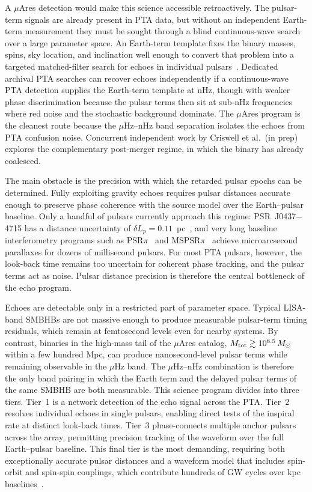 \documentclass[aps,prx,twocolumn,superscriptaddress,nofootinbib,longbibliography]{revtex4-2}
\newcommand{\Msun}{M_\odot}
\begin{document}
A $\mu$Ares detection would make this science accessible retroactively. The pulsar-term signals are already present in PTA data, but without an independent Earth-term measurement they must be sought through a blind continuous-wave search over a large parameter space. An Earth-term template fixes the binary masses, spins, sky location, and inclination well enough to convert that problem into a targeted matched-filter search for echoes in individual pulsars~\cite{Arzoumanian2020targeted,NG15targeted}. Dedicated archival PTA searches can recover echoes independently if a continuous-wave PTA detection supplies the Earth-term template at nHz, though with weaker phase discrimination because the pulsar terms then sit at sub-nHz frequencies where red noise and the stochastic background dominate. The $\mu$Ares program is the cleanest route because the $\mu$Hz--nHz band separation isolates the echoes from PTA confusion noise. Concurrent independent work by Criswell et al.\ (in prep) explores the complementary post-merger regime, in which the binary has already coalesced.

The main obstacle is the precision with which the retarded pulsar epochs can be determined. Fully exploiting gravity echoes requires pulsar distances accurate enough to preserve phase coherence with the source model over the Earth--pulsar baseline. Only a handful of pulsars currently approach this regime: PSR~J0437$-$4715 has a distance uncertainty of $\delta L_p = 0.11$~pc~\cite{Reardon2024}, and very long baseline interferometry programs such as PSR$\pi$~\cite{Deller2019} and MSPSR$\pi$~\cite{Ding2023} achieve microarcsecond parallaxes for dozens of millisecond pulsars. For most PTA pulsars, however, the look-back time remains too uncertain for coherent phase tracking, and the pulsar terms act as noise. Pulsar distance precision is therefore the central bottleneck of the echo program.

Echoes are detectable only in a restricted part of parameter space. Typical LISA-band SMBHBs are not massive enough to produce measurable pulsar-term timing residuals, which remain at femtosecond levels even for nearby systems. By contrast, binaries in the high-mass tail of the $\mu$Ares catalog, $M_{\rm tot} \gtrsim 10^{8.5}\,\Msun$ within a few hundred Mpc, can produce nanosecond-level pulsar terms while remaining observable in the $\mu$Hz band. The $\mu$Hz--nHz combination is therefore the only band pairing in which the Earth term and the delayed pulsar terms of the same SMBHB are both measurable. This science program divides into three tiers. Tier~1 is a network detection of the echo signal across the PTA. Tier~2 resolves individual echoes in single pulsars, enabling direct tests of the inspiral rate at distinct look-back times. Tier~3 phase-connects multiple anchor pulsars across the array, permitting precision tracking of the waveform over the full Earth--pulsar baseline. This final tier is the most demanding, requiring both exceptionally accurate pulsar distances and a waveform model that includes spin-orbit and spin-spin couplings, which contribute hundreds of GW cycles over kpc baselines~\cite{Mingarelli2012}.
\end{document}
